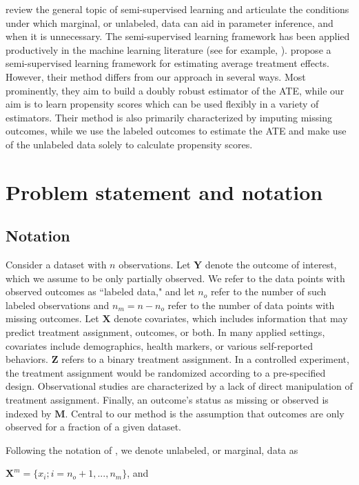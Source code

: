 \documentclass[aos]{imsart}
\newcommand{\X}{\mathbf{X}}
\newcommand{\M}{\mathbf{M}}
\newcommand{\Y}{\mathbf{Y}}
\newcommand{\Z}{\mathbf{Z}}
\begin{document}
\cite{liang2007use} review the general topic of semi-supervised learning and articulate the conditions 
under which marginal, or unlabeled, data can aid in parameter inference, and when it is unnecessary. 
The semi-supervised learning framework has been applied productively in the machine learning literature 
(see for example, \cite{kingma2014semi}).
\cite{cheng2018efficient} propose a semi-supervised learning framework for estimating average treatment effects. 
However, their method differs from our approach in several ways. 
Most prominently, they aim to build a doubly robust estimator of the ATE, while our aim is to 
learn propensity scores which can be used flexibly in a variety of estimators. Their method is also primarily characterized by 
imputing missing outcomes, while we use the labeled outcomes to estimate the ATE and make use of the unlabeled 
data solely to calculate propensity scores.

\section{Problem statement and notation}

\subsection{Notation}

Consider a dataset with $n$ observations. Let $\Y$ denote the outcome of interest, which we assume to be only partially observed. 
We refer to the data points with observed outcomes as ``labeled data," and let $n_o$ refer to the number of such labeled observations 
and $n_m = n - n_o$ refer to the number of data points with missing outcomes.
Let $\X$ denote covariates, which includes information that may predict treatment assignment, outcomes, or both. 
In many applied settings, covariates include demographics, health markers, or various self-reported behaviors.
$\Z$ refers to a binary treatment assignment. In a controlled experiment, the treatment assignment would be randomized according to a pre-specified design. 
Observational studies are characterized by a lack of direct manipulation of treatment assignment. 
Finally, an outcome's status as missing or observed is indexed by $\M$. Central to our method is the assumption that outcomes are only 
observed for a fraction of a given dataset.

Following the notation of \cite{liang2007use}, we denote unlabeled, or marginal, data as

$\X^m = \{x_i; i = n_o + 1, ... , n_m \}$, and 
\end{document}
